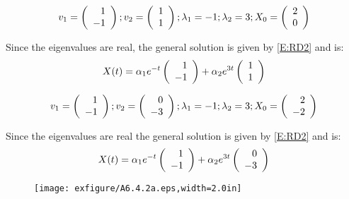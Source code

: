 \documentclass{ximera}
\begin{document}
\begin{exercise} \label{A6.4.1}
\[
v_1 = \Matrix{ 1 \\ -1};  v_2 = \Matrix{ 1 \\ 1 }; \lambda_1 = -1; \lambda_2 = 3; X_0 = \Matrix{2 \\ 0 }
\]

\begin{solution}
\soln Since the eigenvalues are real, the general solution is given by \eqref{E:RD2} and is:
\[
X(t) = \alpha_1 e^{-t} \Matrix{ 1 \\ -1} + \alpha_2 e^{3t}\Matrix{ 1 \\ 1 }
\]

\begin{figure}[htb]
           \centerline{%
           }
\end{figure}

\end{solution}
\end{exercise}

\begin{exercise} \label{A6.4.2}
\[
v_1 = \Matrix{ 1 \\ -1}; v_2 = \Matrix{ 0 \\ -3 }; \lambda_1 = -1; \lambda_2 = 3; X_0 = \Matrix{2 \\ -2 }
\]

\begin{solution}
\soln Since the eigenvalues are real the general solution is given by \eqref{E:RD2} and is:
\[
X(t) = \alpha_1 e^{-t} \Matrix{ 1 \\ -1} + \alpha_2 e^{3t}\Matrix{ 0 \\ -3 }
\]

\begin{figure}[htb]
           \centerline{%
           \texttt{[image: exfigure/A6.4.2a.eps,width=2.0in]}}
\end{figure}
\end{solution}
\end{exercise}
\end{document}
